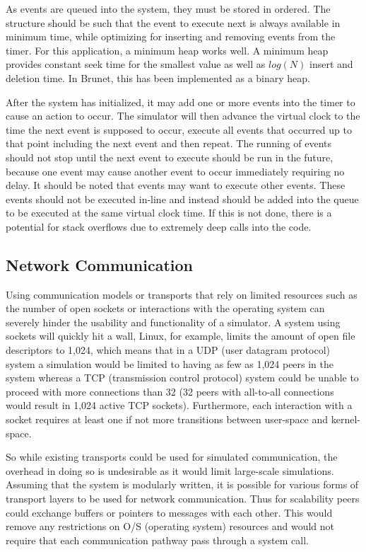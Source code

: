 As events are queued into the system, they must be stored in ordered.  The
structure should be such that the event to execute next is always available in
minimum time, while optimizing for inserting and removing events from the
timer.  For this application, a minimum heap works well.  A minimum heap
provides constant seek time for the smallest value as well as $log(N)$ insert
and deletion time.  In Brunet, this has been implemented as a binary heap.

After the system has initialized, it may add one or more events into the timer
to cause an action to occur.  The simulator will then advance the virtual clock
to the time the next event is supposed to occur, execute all events that
occurred up to that point including the next event and then repeat.  The
running of events should not stop until the next event to execute should be run
in the future, because one event may cause another event to occur immediately
requiring no delay.  It should be noted that events may want to execute other
events.  These events should not be executed in-line and instead should be
added into the queue to be executed at the same virtual clock time.  If this is
not done, there is a potential for stack overflows due to extremely deep calls
into the code.

\subsection{Network Communication}
\label{ap2p:nc}

Using communication models or transports that rely on limited resources such as
the number of open sockets or interactions with the operating system can
severely hinder the usability and functionality of a simulator.  A system using
sockets will quickly hit a wall, Linux, for example, limits the amount of open
file descriptors to 1,024, which means that in a UDP (user datagram protocol)
system a simulation would be limited to having as few as 1,024 peers in the
system whereas a TCP (transmission control protocol) system could be unable to
proceed with more connections than 32 (32 peers with all-to-all connections
would result in 1,024 active TCP sockets).  Furthermore, each interaction with
a socket requires at least one if not more transitions between user-space and
kernel-space.

So while existing transports could be used for simulated communication, the
overhead in doing so is undesirable as it would limit large-scale simulations.
Assuming that the system is modularly written, it is possible for various forms
of transport layers to be used for network communication.  Thus for scalability
peers could exchange buffers or pointers to messages with each other.  This
would remove any restrictions on O/S (operating system) resources and would not
require that each communication pathway pass through a system call.


